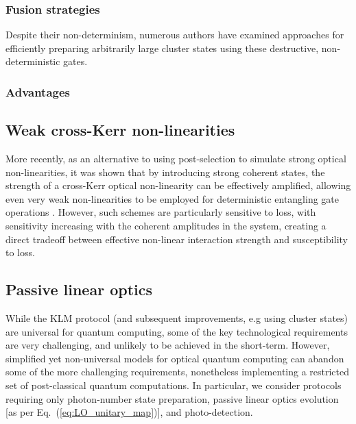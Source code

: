 \documentclass[aps, rmp, twocolumn, amsmath, amssymb, nofootinbib, superscriptaddress, longbibliography, floatfix, table-of-contents, eqsecnum]{revtex4-1}
\newcommand{\comment}[1]{{\color{blue}{\textbf{#1}}}}
\begin{document}
\subsubsection{Fusion strategies} 

Despite their non-determinism, numerous authors have examined approaches for efficiently preparing arbitrarily large cluster states using these destructive, non-deterministic gates.

\comment{To do!}

%
%

\subsubsection{Advantages} 

\comment{To do!}

%
%

\subsection{Weak cross-Kerr non-linearities} 

More recently, as an alternative to using post-selection to simulate strong optical non-linearities, it was shown that by introducing strong coherent states, the strength of a cross-Kerr optical non-linearity can be effectively amplified, allowing even very weak non-linearities to be employed for deterministic entangling gate operations \cite{bib:Munro05}. However, such schemes are particularly sensitive to loss, with sensitivity increasing with the coherent amplitudes in the system, creating a direct tradeoff between effective non-linear interaction strength and susceptibility to loss.

\comment{To do! Bill Munro perhaps?}

%
%

\subsection{Passive linear optics} \label{sec:passive_LO} 

While the KLM protocol (and subsequent improvements, e.g using cluster states) are universal for quantum computing, some of the key technological requirements are very challenging, and unlikely to be achieved in the short-term. However, simplified yet non-universal models for optical quantum computing can abandon some of the more challenging requirements, nonetheless implementing a restricted set of post-classical quantum computations. In particular, we consider protocols requiring only photon-number state preparation, passive linear optics evolution [as per Eq.~(\ref{eq:LO_unitary_map})], and photo-detection.
\end{document}
